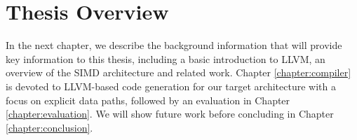 
\section{Thesis Overview}


In the next chapter, we describe the background information that will provide key information to this thesis, including a basic introduction to LLVM, an overview of the SIMD architecture and related work. Chapter \ref{chapter:compiler} is devoted to LLVM-based code generation for our target architecture with a focus on explicit data paths, followed by an evaluation in Chapter \ref{chapter:evaluation}. We will show future work %
before concluding in Chapter \ref{chapter:conclusion}.


